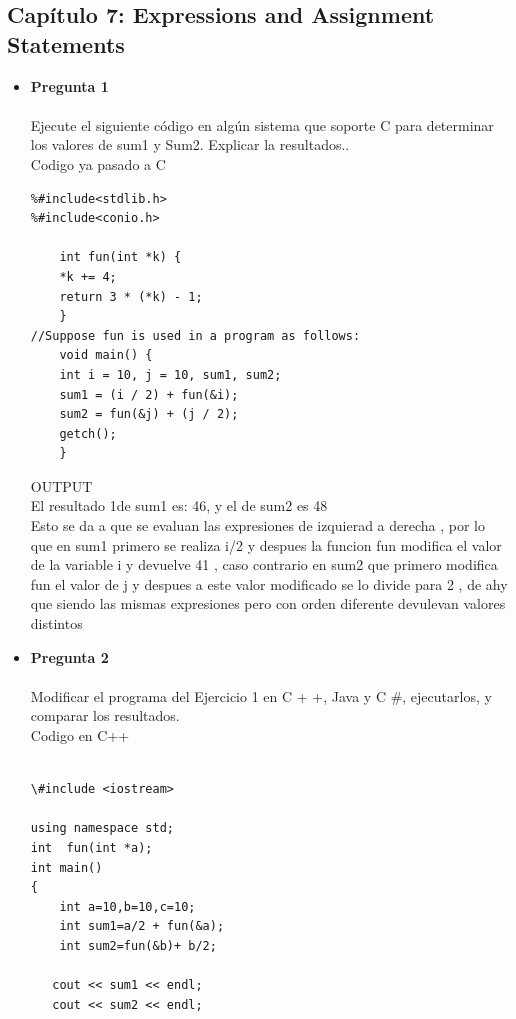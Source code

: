 \documentclass[12pt,oneside]{article}
\begin{document}
\subsection{Capítulo 7: Expressions and Assignment Statements}
\begin{itemize}
\item {\bf Pregunta 1} \\\\
Ejecute el siguiente código  en algún sistema 
que soporte C para determinar los valores de sum1 y Sum2. Explicar la 
resultados..\\
Codigo ya pasado a  C\\
\begin{lstlisting}[frame=single]  % Start your code-block
%#include<stdio.h>
%#include<stdlib.h>
%#include<conio.h>

	int fun(int *k) {
	*k += 4;
	return 3 * (*k) - 1;
	}
//Suppose fun is used in a program as follows:
	void main() {
	int i = 10, j = 10, sum1, sum2;
	sum1 = (i / 2) + fun(&i);
	sum2 = fun(&j) + (j / 2);
	getch();
	}

\end{lstlisting}
OUTPUT\\
El resultado 1de sum1 es: 46, y el de sum2 es 48\\
Esto se da a que se evaluan las expresiones de izquierad a derecha , por lo que en sum1  primero se realiza i/2 y despues la funcion fun modifica el valor de la variable i y devuelve 41  , caso contrario en sum2 que primero modifica fun el valor de j y despues a este valor modificado se lo divide para 2 , de ahy que siendo las mismas expresiones pero con orden diferente devulevan valores distintos

\item {\bf Pregunta 2} \\\\
Modificar el programa del Ejercicio  1 en C + +, Java y C \#, 
ejecutarlos, y comparar los resultados.\\

Codigo en C++\\
\begin{lstlisting}[frame=single]  % Start your code-block

\#include <iostream>

using namespace std;
int  fun(int *a); 
int main()
{
    int a=10,b=10,c=10;
    int sum1=a/2 + fun(&a);
    int sum2=fun(&b)+ b/2;
    
   cout << sum1 << endl; 
   cout << sum2 << endl; 
   

\end{lstlisting}
\end{itemize}
\end{document}
